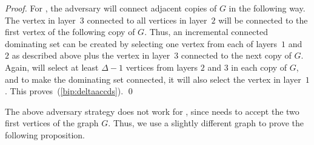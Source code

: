 \begin{proof}
For \cds, the adversary will connect adjacent copies of $G$ in the
following way.
The vertex in layer~$3$ connected to all vertices in layer~$2$ will be
connected to the first vertex of the following copy of $G$.
Thus, an incremental connected dominating set can be created by
selecting one vertex from each of layers~$1$ and~$2$ as described
above plus the vertex in layer~$3$ connected to the next copy of $G$.
Again, \A will select at least $\Delta-1$ vertices from layers $2$
and $3$ in each copy of $G$, and to make the dominating set connected,
it will also select the vertex in layer~$1$.
This proves~(\ref{bip:deltaaccds}). 
\qed\end{proof}

The above adversary strategy does not work for \tds, since \onopt
needs to accept the two first vertices of the graph $G$.
Thus, we use a slightly different graph to prove the following
proposition.

